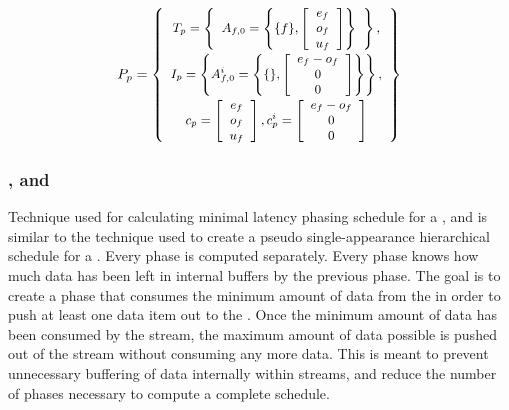 \begin{displaymath} \small
P_p = \left\{
\begin{array}{c}
T_p = \left\{
\begin{array}{c}
A_{f,0} = \left\{ \{f\}, \left[\begin{array}{c} e_f \\ o_f \\ u_f \end{array}\right]\right\} \\
\end{array}\right\}, \\
I_p = \left\{ A^i_{f,0} = \left\{ \{ \}, \left[\begin{array}{c}e_f - o_f \\ 0 \\ 0 \end{array}\right]\right\} \right\}, \\
c_p = \left[ \begin{array}{c} e_f \\ o_f \\ u_f \end{array}
\right], c^i_p = \left[ \begin{array}{c} e_f - o_f \\ 0 \\ 0
\end{array} \right]
\end{array}
\right\}
\end{displaymath}

\subsubsection{{\pipeline}, {\splitjoin} and {\feedbackloop}}

Technique used for calculating minimal latency phasing schedule
for a {\pipeline}, {\splitjoin} and {{\feedbackloop}} is similar to
the technique used to create a pseudo single-appearance
hierarchical schedule for a {{\feedbackloop}}. Every phase is
computed separately. Every phase knows how much data has been left
in internal buffers by the previous phase.  The goal is to create
a phase that consumes the minimum amount of data from the {\Input}
{{\Channel}} in order to push at least one data item out to the
{\Output} {{\Channel}}. Once the minimum amount of data has been
consumed by the stream, the maximum amount of data possible is
pushed out of the stream without consuming any more data. This is
meant to prevent unnecessary buffering of data internally within
streams, and reduce the number of phases necessary to compute a
complete schedule.

